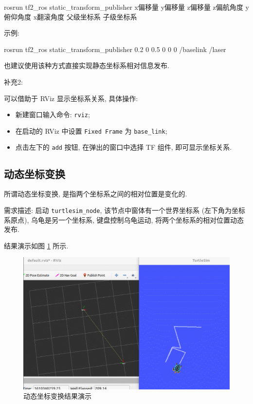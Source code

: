 \documentclass[openany, fontset=windowsold]{ctexbook}
\theoremstyle{kaiti}
\theoremstyle{normal}
\begin{document}
\begin{bash}
  rosrun tf2_ros static_transform_publisher x偏移量 y偏移量 z偏移量 z偏航角度 y俯仰角度 x翻滚角度 父级坐标系 子级坐标系
\end{bash}

示例:

\begin{bash}
  rosrun tf2_ros static_transform_publisher 0.2 0 0.5 0 0 0 /baselink /laser
\end{bash}

也建议使用该种方式直接实现静态坐标系相对信息发布.

补充2:

可以借助于 RViz 显示坐标系关系, 具体操作:

\begin{itemize}
  \item 新建窗口输入命令: \verb|rviz|;
  \item 在启动的 RViz 中设置 \verb|Fixed Frame| 为 \verb|base_link|;
  \item 点击左下的 \verb|add| 按钮, 在弹出的窗口中选择 TF 组件, 即可显示坐标关系.
\end{itemize}

\subsection{动态坐标变换}

所谓动态坐标变换, 是指两个坐标系之间的相对位置是变化的.

需求描述: 启动 \verb|turtlesim_node|, 该节点中窗体有一个世界坐标系 (左下角为坐标系原点), 乌龟是另一个坐标系, 键盘控制乌龟运动, 将两个坐标系的相对位置动态发布.

结果演示如图 \ref{fig:ros_demo_dynamic_tf} 所示.

\begin{figure}[!ht]
  \centering
  \includegraphics[width=.9\textwidth]{ros_demo_dynamic_tf.png}
  \caption{动态坐标变换结果演示}
  \label{fig:ros_demo_dynamic_tf}
\end{figure}
\end{document}

